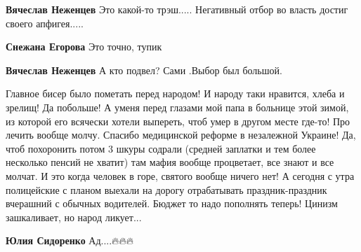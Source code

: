 \begin{itemize}
\begin{itemize}
\textbf{Вячеслав Неженцев} Это какой-то трэш.....
Негативный отбор во власть достиг своего апфигея.....

 
\textbf{Снежана Егорова} Это точно, тупик

 
\textbf{Вячеслав Неженцев} А кто подвел? Сами .Выбор был большой.
\end{itemize}

 

Главное бисер было пометать перед народом! И народу таки нравится, хлеба и
зрелищ! Да побольше! А уменя перед глазами мой папа в больнице этой зимой, из
которой его всячески хотели выпереть, чтоб умер в другом месте где-то! Про
лечить вообще молчу. Спасибо медицинской реформе в незалежной Украине! Да, чтоб
похоронить потом 3 шкуры содрали (средней заплатки и тем более несколько пенсий
не хватит) там мафия вообще процветает, все знают и все молчат. И это когда
человек в горе, святого вообще ничего нет! А сегодня с утра полицейские с
планом выехали на дорогу отрабатывать праздник-праздник вчерашний с обычных
водителей. Бюджет то надо пополнять теперь! Цинизм зашкаливает, но народ
ликует...

\begin{itemize}
 
\textbf{Юлия Сидоренко} Ад....🔥🔥🔥
\end{itemize}

 


\end{itemize}
